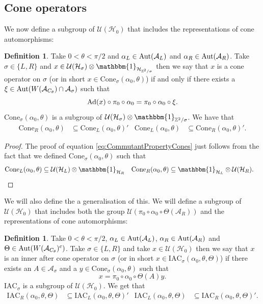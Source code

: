 \documentclass[12pt,a4paper,twoside]{article}
\newcommand{\IAC}{\textrm{IAC}}
\let\originalleft\left
\let\originalright\right
\renewcommand{\left}{\mathopen{}\mathclose\bgroup\originalleft}
\renewcommand{\right}{\aftergroup\egroup\originalright}
\newcommand{\UU}{\mathcal U}
\newcommand{\HH}{\mathcal H}
\newcommand{\ZZ}{\mathbb Z}
\renewcommand{\AA}{\mathcal A}
\newcommand{\id}{\mathbbm{1}}
\newcommand{\Ad}[1]{\textrm{Ad}\left(#1\right)}
\newcommand{\Aut}[1]{\textrm{Aut}\left(#1\right)}
\theoremstyle{definition}
\newtheorem{definition}[theorem]{Definition}
\numberwithin{equation}{section}
\begin{document}
\subsection{Cone operators}
 We now define a subgroup of $\UU(\HH_0)$ that includes the representations of cone automorphisms:
\begin{definition}\label{def:ConeOperators}
	Take $0<\theta<\pi/2$ and $\alpha_L\in\Aut{\AA_{L}}$ and $\alpha_R\in\Aut{\AA_{R}}$. Take $\sigma\in\{L,R\}$ and $x\in\UU(\HH_{\sigma})\otimes\id_{\HH_{\ZZ^2/\sigma}}$ then we say that $x$ is a cone operator on $\sigma$ (or in short $x\in\textrm{Cone}_{\sigma}(\alpha_0,\theta)$) if and only if there exists a $\xi\in\Aut{W(\AA_{C_\theta})\cap\AA_\sigma}$ such that
	\begin{equation}
		\Ad{x}\circ\pi_0\circ\alpha_0=\pi_0\circ\alpha_0\circ\xi.
	\end{equation}
	$\textrm{Cone}_\sigma(\alpha_0,\theta)$ is a subgroup of $\UU(\HH_\sigma)\otimes\id_{\ZZ^2/\sigma}$. We have that
	\begin{align}\label{eq:CommutantPropertyCones}
		\textrm{Cone}_R(\alpha_0,\theta)&\subseteq\textrm{Cone}_L(\alpha_0,\theta)'&\textrm{Cone}_L(\alpha_0,\theta)&\subseteq\textrm{Cone}_R(\alpha_0,\theta)'.
	\end{align}
\end{definition}
\begin{proof}
	The proof of equation \eqref{eq:CommutantPropertyCones} just follows from the fact that we defined $\textrm{Cone}_\sigma(\alpha_0,\theta)$ such that
	\begin{align}
		\textrm{Cone}_L(\alpha_0,\theta)&\subseteq \UU(\HH_L)\otimes\id_{\HH_R}&\textrm{Cone}_R(\alpha_0,\theta)&\subseteq \id_{\HH_L} \otimes \UU(\HH_R).
	\end{align}
\end{proof}
We will also define the a generalisation of this. We will define a subgroup of $\UU(\HH_0)$ that includes both the group $\UU(\pi_0\circ\alpha_0\circ\Theta(\AA_R))$ and the representations of cone automorphisms:
\begin{definition}
	Take $0<\theta<\pi/2$, $\alpha_L\in\Aut{\AA_{L}}$, $\alpha_R\in\Aut{\AA_{R}}$ and $\Theta\in\Aut{W(\AA_{C_\theta})^c}$. Take $\sigma\in\{L,R\}$ and take $x\in\UU(\HH_0)$ then we say that $x$ is an inner after cone operator on $\sigma$ (or in short $x\in \IAC_\sigma(\alpha_0,\theta,\Theta)$) if there exists an $A\in\AA_\sigma$ and a $y\in\textrm{Cone}_\sigma(\alpha_0,\theta)$ such that
	\begin{equation}
		x=\pi_0\circ\alpha_0\circ\Theta(A)y.
	\end{equation}
	$\IAC_\sigma$ is a subgroup of $\UU(\HH_0)$. We get that
	\begin{align}\label{eq:CommutantProperty}
		\IAC_R(\alpha_0,\theta,\Theta)&\subseteq\IAC_L(\alpha_0,\theta,\Theta)'&\IAC_L(\alpha_0,\theta,\Theta)&\subseteq\IAC_R(\alpha_0,\theta,\Theta)'.
	\end{align}
\end{definition}
\end{document}

